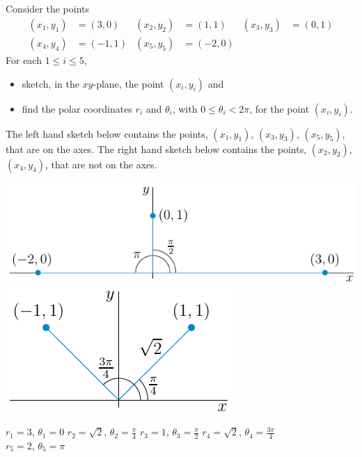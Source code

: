 
\newcommand{\he}{\hat{\mathbf{e}}}



\subsection*{\Conceptual}


\begin{question}
Consider the points
\begin{align*}
(x_1,y_1) &= (3,0) &
(x_2,y_2) &= (1,1)  &
(x_3,y_3) &= (0,1) \\
(x_4,y_4) &= (-1,1) &
(x_5,y_5) &= (-2,0)
\end{align*}
For each $1\le i\le 5$, 
\begin{itemize}
\item
sketch, in the $xy$-plane, the point $(x_i,y_i)$ and
\item
find the polar coordinates $r_i$ and $\theta_i$,
with $0\le\theta_i<2\pi$, for the point $(x_i,y_i)$.
\end{itemize}
\end{question}


\begin{answer} 
The left hand sketch below contains the points, $(x_1,y_1)$, $(x_3,y_3)$,
$(x_5,y_5)$, that are on the axes. The right hand sketch below contains the
points, $(x_2,y_2)$, $(x_4,y_4)$, that are not on the axes.
\begin{center}
  \includegraphics[scale=0.95]{fig/polar3A.pdf}\quad
  \includegraphics[scale=0.95]{fig/polar2A.pdf}
\end{center}
    $r_1 = 3$,        $\theta_1=0$\qquad 
    $r_2 = \sqrt{2}$, $\theta_2=\frac{\pi}{4}$\qquad 
    $r_3 = 1$,        $\theta_3=\frac{\pi}{2}$\qquad 
    $r_4 = \sqrt{2}$, $\theta_4=\frac{3\pi}{4}$\\
    $r_5 = 2$,        $\theta_5=\pi$
\end{answer}


